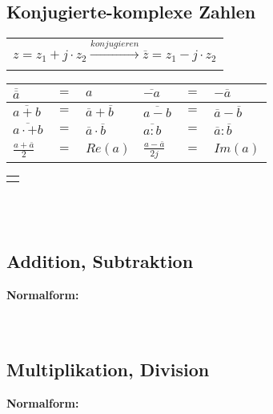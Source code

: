 	\begin{minipage}[t]{0.5\textwidth}
		\subsection{Konjugierte-komplexe Zahlen}
			\begin{tabular}{c}
				$z = z_{1} + j \cdot z_{2} \xrightarrow[]{konjugieren} \overline{z} = z_{1} - j \cdot z_{2}$\\[3pt]
			\end{tabular}
			\begin{tabular}{|lcl|lcl|}
				\hline
				$\overline{\overline{a}}$ & $=$ & $a$ & $\overline{-a}$ & $=$ & $-\overline{a}$\\
				\hline
				$\overline{a + b}$ & $=$ & $\overline{a} + \overline{b}$ & $\overline{a - b}$ & $=$ & $\overline{a} - \overline{b}$\\
				\hline
				$\overline{a \cdot+ b}$ & $=$ & $\overline{a} \cdot \overline{b}$ & $\overline{a : b}$ & $=$ & $\overline{a} : \overline{b}$\\
				\hline
				$\frac{a + \overline{a}}{2}$ & $=$ & $ Re(a)$ & $\frac{a - \overline{a}}{2j}$ & $=$ & $Im(a)$\\
				\hline
			\end{tabular}
			\begin{tabular}{c}
				\scalebox{1}{}\\[3pt]
			\end{tabular}\\[3pt]
			\\[3pt]
	\end{minipage}
	\begin{minipage}[t]{0.5\textwidth}
		\subsection{Addition, Subtraktion}
			\textbf{Normalform:}\\[3pt]
			\\[3pt]
			\\[3pt]
		\subsection{Multiplikation, Division}
			\textbf{Normalform:}\\[3pt]
			\\[3pt]
			\\[3pt]
			\scalebox{1}{}\\[3pt]
	\end{minipage}
	
